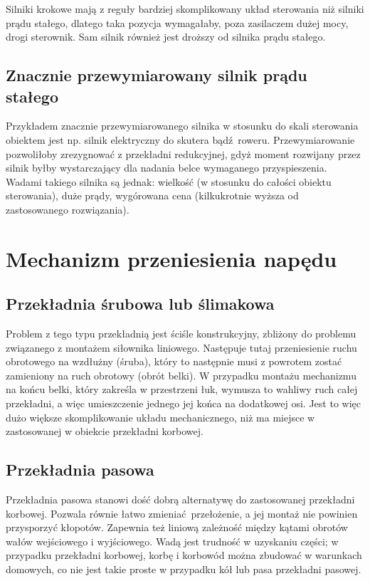 Silniki krokowe mają z reguły bardziej skomplikowany układ sterowania niż silniki prądu stałego, dlatego taka pozycja wymagałaby, poza zasilaczem dużej mocy, drogi sterownik. Sam silnik również jest droższy od silnika prądu stałego.

\subsection{Znacznie przewymiarowany silnik prądu stałego}

Przykładem znacznie przewymiarowanego silnika w stosunku do skali sterowania obiektem jest np. silnik elektryczny do skutera bądź roweru. Przewymiarowanie pozwoliłoby zrezygnować z przekładni redukcyjnej, gdyż moment rozwijany przez silnik byłby wystarczający dla nadania belce wymaganego przyspieszenia. Wadami takiego silnika są jednak: wielkość (w stosunku do całości obiektu sterowania), duże prądy, wygórowana cena (kilkukrotnie wyższa od zastosowanego rozwiązania).


\section{Mechanizm przeniesienia napędu}

\subsection{Przekładnia śrubowa lub ślimakowa}

Problem z tego typu przekładnią jest ściśle konstrukcyjny, zbliżony do problemu związanego z montażem siłownika liniowego. Następuje tutaj przeniesienie ruchu obrotowego na wzdłużny (śruba), który to następnie musi z powrotem zostać zamieniony na ruch obrotowy (obrót belki). W przypadku montażu mechanizmu na końcu belki, który zakreśla w przestrzeni łuk, wymusza to wahliwy ruch całej przekładni, a więc umieszczenie jednego jej końca na dodatkowej osi. Jest to więc dużo większe skomplikowanie układu mechanicznego, niż ma miejsce w zastosowanej w obiekcie przekładni korbowej.

\subsection{Przekładnia pasowa}

Przekładnia pasowa stanowi dość dobrą alternatywę do zastosowanej przekładni korbowej. Pozwala równie łatwo zmieniać przełożenie, a jej montaż nie powinien przysporzyć kłopotów. Zapewnia też liniową zależność między kątami obrotów wałów wejściowego i wyjściowego. Wadą jest trudność w uzyskaniu części; w przypadku przekładni korbowej, korbę i korbowód można zbudować w warunkach domowych, co nie jest takie proste w przypadku kół lub pasa przekładni pasowej.